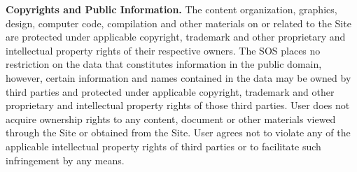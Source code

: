 \textbf{Copyrights and Public Information.}
The content organization, graphics, design, computer code, compilation and other
materials on or related to the Site are protected under applicable copyright,
trademark and other proprietary and intellectual property rights of their
respective owners. The SOS places no restriction on the data that constitutes
information in the public domain, however, certain information and names
contained in the data may be owned by third parties and protected under
applicable copyright, trademark and other proprietary and intellectual property
rights of those third parties. User does not acquire ownership rights to any
content, document or other materials viewed through the Site or obtained from
the Site. User agrees not to violate any of the applicable intellectual property
rights of third parties or to facilitate such infringement by any means.